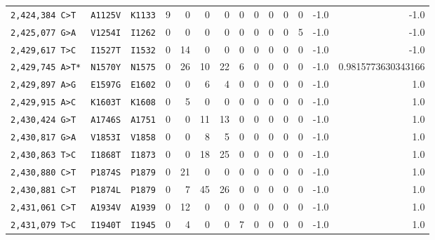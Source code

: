 \begin{tabular}{lllrrrrrrrrrrr}
\texttt{2,424,384 C>T} & \texttt{A1125V} & \texttt{K1133} & 9 & 0 & 0 & 0 & 0 & 0 & 0 & 0 & 0 & -1.0 & -1.0 \\

\texttt{2,425,077 G>A} & \texttt{V1254I} & \texttt{I1262} & 0 & 0 & 0 & 0 & 0 & 0 & 0 & 0 & 5 & -1.0 & -1.0 \\

\texttt{2,429,617 T>C} & \texttt{I1527T} & \texttt{I1532} & 0 & 14 & 0 & 0 & 0 & 0 & 0 & 0 & 0 & -1.0 & -1.0 \\

\texttt{2,429,745 A>T*} & \texttt{N1570Y} & \texttt{N1575} & 0 & 26 & 10 & 22 & 6 & 0 & 0 & 0 & 0 & -1.0 & 0.9815773630343166 \\

\texttt{2,429,897 A>G} & \texttt{E1597G} & \texttt{E1602} & 0 & 0 & 6 & 4 & 0 & 0 & 0 & 0 & 0 & -1.0 & 1.0 \\

\texttt{2,429,915 A>C} & \texttt{K1603T} & \texttt{K1608} & 0 & 5 & 0 & 0 & 0 & 0 & 0 & 0 & 0 & -1.0 & 1.0 \\

\texttt{2,430,424 G>T} & \texttt{A1746S} & \texttt{A1751} & 0 & 0 & 11 & 13 & 0 & 0 & 0 & 0 & 0 & -1.0 & 1.0 \\

\texttt{2,430,817 G>A} & \texttt{V1853I} & \texttt{V1858} & 0 & 0 & 8 & 5 & 0 & 0 & 0 & 0 & 0 & -1.0 & 1.0 \\

\texttt{2,430,863 T>C} & \texttt{I1868T} & \texttt{I1873} & 0 & 0 & 18 & 25 & 0 & 0 & 0 & 0 & 0 & -1.0 & 1.0 \\

\texttt{2,430,880 C>T} & \texttt{P1874S} & \texttt{P1879} & 0 & 21 & 0 & 0 & 0 & 0 & 0 & 0 & 0 & -1.0 & 1.0 \\

\texttt{2,430,881 C>T} & \texttt{P1874L} & \texttt{P1879} & 0 & 7 & 45 & 26 & 0 & 0 & 0 & 0 & 0 & -1.0 & 1.0 \\

\texttt{2,431,061 C>T} & \texttt{A1934V} & \texttt{A1939} & 0 & 12 & 0 & 0 & 0 & 0 & 0 & 0 & 0 & -1.0 & 1.0 \\

\texttt{2,431,079 T>C} & \texttt{I1940T} & \texttt{I1945} & 0 & 4 & 0 & 0 & 7 & 0 & 0 & 0 & 0 & -1.0 & 1.0 \\

\bottomrule
\end{tabular}
